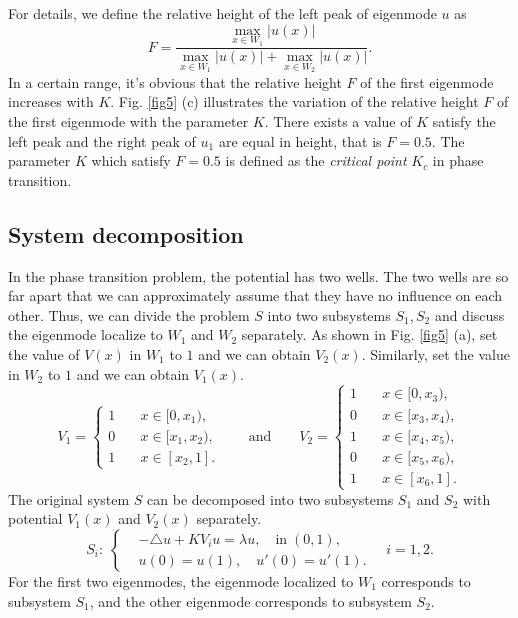 \documentclass[a4paper,11pt]{article}
\begin{document}
For details, we define the relative height of the left peak of eigenmode $u$ as 
\begin{equation}
F = \frac{\max_{x \in W_1} |u(x)|}{\max_{x \in W_1} |u(x)| + \max_{x \in W_2} |u(x)|}.
\end{equation}
In a certain range, it's obvious that the relative height $F$ of the first eigenmode increases with $K$. Fig. \ref{fig5} (c) illustrates the variation of the relative height $F$ of the first eigenmode with the parameter $K$. There exists a value of $K$ satisfy the left peak and the right peak of $u_1$ are equal in height, that is $F = 0.5$. The parameter $K$ which satisfy $F = 0.5$ is defined as the \emph{critical point} $K_c$ in phase transition.

\subsection{System decomposition}

In the phase transition problem, the potential has two wells. The two wells are so far apart that we can approximately assume that they have no influence on each other. Thus, we can divide the problem $S$ into two subsystems $S_1, S_2$ and discuss the eigenmode localize to $W_1$ and $W_2$ separately. As shown in Fig. \ref{fig5} (a), set the value of $V(x)$ in $W_1$ to $1$ and we can obtain $V_2(x)$. Similarly, set the value in $W_2$ to $1$ and we can obtain $V_1(x)$.
\begin{equation}
V_1 = \left\{
\begin{split}
1 & \quad x \in [0, x_1), \\
0 & \quad x \in [x_1, x_2), \\
1 & \quad x \in [x_2, 1].
\end{split}
\right.
\qquad
\text{and}
\qquad
V_2 = \left\{
\begin{split}
1 & \quad x \in [0, x_3), \\
0 & \quad x \in [x_3, x_4), \\
1 & \quad x \in [x_4, x_5), \\
0 & \quad x \in [x_5, x_6), \\
1 & \quad x \in [x_6, 1].
\end{split}
\right.
\end{equation}
The original system $S$ can be decomposed into two subsystems $S_1$ and $S_2$ with potential $V_1(x)$ and $V_2(x)$ separately.
\begin{equation}
S_i: \;
\left\{
\begin{split}
& -\triangle u + K V_i u = \lambda u, \quad \textrm{in} \; (0, 1), \\
& u(0) = u(1), \quad u'(0) =  u'(1).
\end{split}
\right.
\quad
i = 1, 2.
\end{equation}
For the first two eigenmodes, the eigenmode localized to $W_1$ corresponds to subsystem $S_1$, and the other eigenmode corresponds to subsystem $S_2$. 
\end{document}

